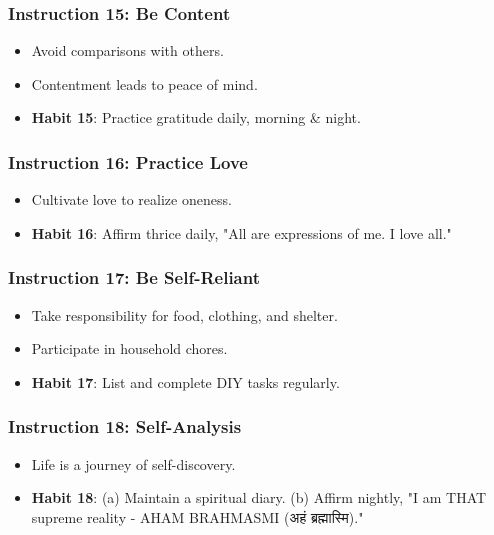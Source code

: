 \begin{frame}[fragile]\frametitle{Instruction 15: Be Content}
      \begin{itemize}
          \item Avoid comparisons with others.
          \item Contentment leads to peace of mind.
          \item \textbf{Habit 15}: Practice gratitude daily, morning \& night.
      \end{itemize}
\end{frame}

\begin{frame}[fragile]\frametitle{Instruction 16: Practice Love}
      \begin{itemize}
          \item Cultivate love to realize oneness.
          \item \textbf{Habit 16}: Affirm thrice daily, "All are expressions of me. I love all."
      \end{itemize}
\end{frame}

\begin{frame}[fragile]\frametitle{Instruction 17: Be Self-Reliant}
      \begin{itemize}
          \item Take responsibility for food, clothing, and shelter.
          \item Participate in household chores.
          \item \textbf{Habit 17}: List and complete DIY tasks regularly.
      \end{itemize}
\end{frame}

\begin{frame}[fragile]\frametitle{Instruction 18: Self-Analysis}
      \begin{itemize}
          \item Life is a journey of self-discovery.
          \item \textbf{Habit 18}: (a) Maintain a spiritual diary. (b) Affirm nightly, "I am THAT supreme reality - AHAM BRAHMASMI (अहं ब्रह्मास्मि)."
      \end{itemize}
\end{frame}

